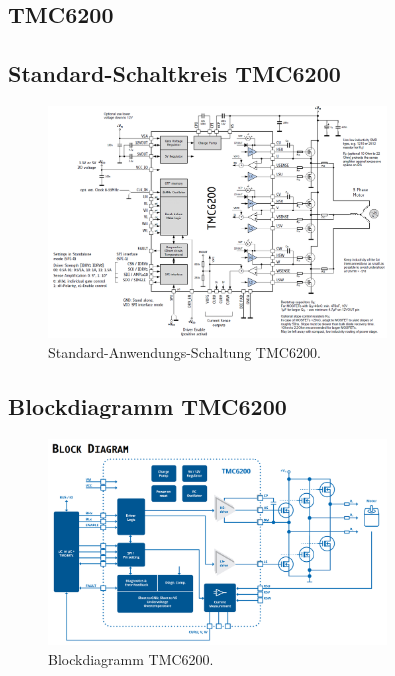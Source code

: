 \begin{appendix}
\newpage

\section{TMC6200}\label{Appendix:TMC6200}

\subsection{Standard-Schaltkreis TMC6200}

\begin{figure}[h!]
	\centering
	\includegraphics[width=0.8\textwidth]{graphics/Standard_Application_Cirquit_TMC6200.png}
	\caption{Standard-Anwendungs-Schaltung TMC6200.}
	\label{fig:Schaltung_TMC6200}
\end{figure}

\subsection{Blockdiagramm TMC6200}

\begin{figure}[h!]
	\centering
	\includegraphics[width=0.8\textwidth]{graphics/Blockdiagramm_TMC6200.png}
	\caption{Blockdiagramm TMC6200.}
	\label{fig:Blockdiagramm_TMC6200}
\end{figure}


\end{appendix}
